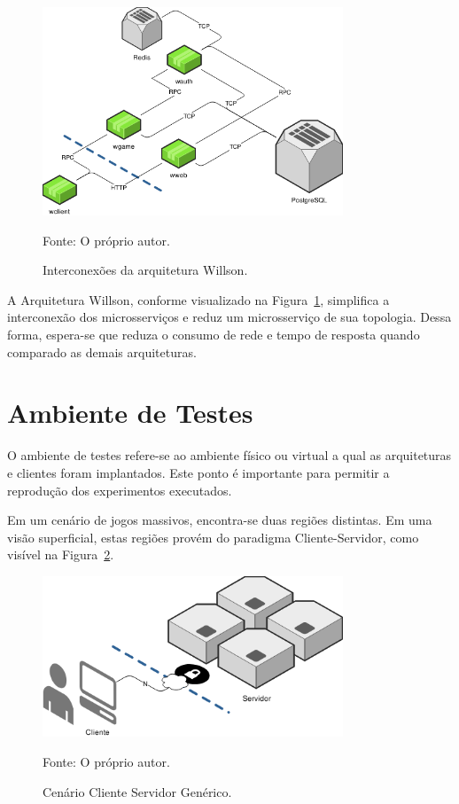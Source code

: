 \begin{figure}[htb!]
  \caption{Interconexões da arquitetura Willson.}
  \label{fig:interconexao_willson}
  \includegraphics[width=0.8\textwidth]{figuras/interconexoes/willson.png}
  \centering

  Fonte: O próprio autor.
\end{figure}



A Arquitetura Willson, conforme visualizado na Figura~\ref{fig:interconexao_willson}, simplifica a interconexão dos microsserviços e reduz um microsserviço de sua topologia.
%
Dessa forma, espera-se que reduza o consumo de rede e tempo de resposta quando comparado as demais arquiteturas.



\section{Ambiente de Testes}
\label{sec:ambiente_de_testes}



O ambiente de testes refere-se ao ambiente físico ou virtual a qual as arquiteturas e clientes foram implantados.
%
Este ponto é importante para permitir a reprodução dos experimentos executados.



Em um cenário de jogos massivos, encontra-se duas regiões distintas.
%
Em uma visão superficial, estas regiões provém do paradigma Cliente-Servidor, como visível na Figura~\ref{fig:cenario_cliente_servidor}.

\begin{figure}[htb!]
  \caption{Cenário Cliente Servidor Genérico.}
  \label{fig:cenario_cliente_servidor}
  \includegraphics[width=0.8\textwidth]{figuras/ambiente/cs.png}
  \centering

  Fonte: O próprio autor.
\end{figure}



